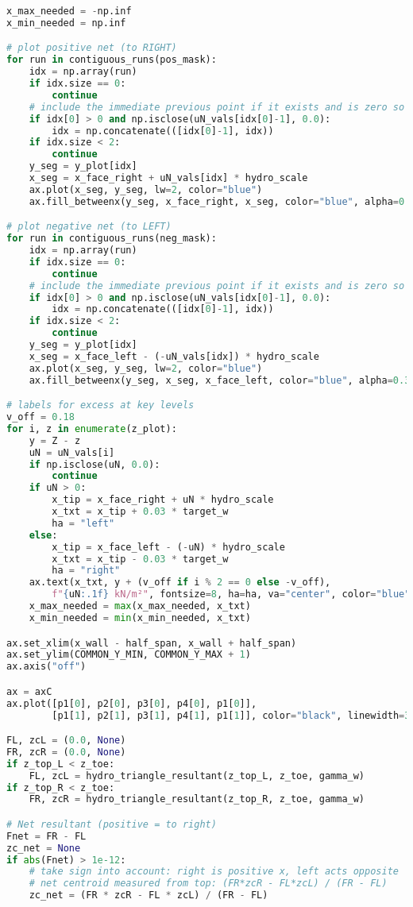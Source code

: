 \begin{lstlisting}[language=Python]
x_max_needed = -np.inf
x_min_needed = np.inf

# plot positive net (to RIGHT)
for run in contiguous_runs(pos_mask):
    idx = np.array(run)
    if idx.size == 0:
        continue
    # include the immediate previous point if it exists and is zero so the wedge anchors at GWT
    if idx[0] > 0 and np.isclose(uN_vals[idx[0]-1], 0.0):
        idx = np.concatenate(([idx[0]-1], idx))
    if idx.size < 2:
        continue
    y_seg = y_plot[idx]
    x_seg = x_face_right + uN_vals[idx] * hydro_scale
    ax.plot(x_seg, y_seg, lw=2, color="blue")
    ax.fill_betweenx(y_seg, x_face_right, x_seg, color="blue", alpha=0.30)

# plot negative net (to LEFT)
for run in contiguous_runs(neg_mask):
    idx = np.array(run)
    if idx.size == 0:
        continue
    # include the immediate previous point if it exists and is zero so the wedge anchors at GWT
    if idx[0] > 0 and np.isclose(uN_vals[idx[0]-1], 0.0):
        idx = np.concatenate(([idx[0]-1], idx))
    if idx.size < 2:
        continue
    y_seg = y_plot[idx]
    x_seg = x_face_left - (-uN_vals[idx]) * hydro_scale
    ax.plot(x_seg, y_seg, lw=2, color="blue")
    ax.fill_betweenx(y_seg, x_seg, x_face_left, color="blue", alpha=0.30)

# labels for excess at key levels
v_off = 0.18
for i, z in enumerate(z_plot):
    y = Z - z
    uN = uN_vals[i]
    if np.isclose(uN, 0.0):
        continue
    if uN > 0:
        x_tip = x_face_right + uN * hydro_scale
        x_txt = x_tip + 0.03 * target_w
        ha = "left"
    else:
        x_tip = x_face_left - (-uN) * hydro_scale
        x_txt = x_tip - 0.03 * target_w
        ha = "right"
    ax.text(x_txt, y + (v_off if i % 2 == 0 else -v_off),
        f"{uN:.1f} kN/m²", fontsize=8, ha=ha, va="center", color="blue")
    x_max_needed = max(x_max_needed, x_txt)
    x_min_needed = min(x_min_needed, x_txt)

ax.set_xlim(x_wall - half_span, x_wall + half_span)
ax.set_ylim(COMMON_Y_MIN, COMMON_Y_MAX + 1)
ax.axis("off")

ax = axC
ax.plot([p1[0], p2[0], p3[0], p4[0], p1[0]],
        [p1[1], p2[1], p3[1], p4[1], p1[1]], color="black", linewidth=3)

FL, zcL = (0.0, None)
FR, zcR = (0.0, None)
if z_top_L < z_toe:
    FL, zcL = hydro_triangle_resultant(z_top_L, z_toe, gamma_w)
if z_top_R < z_toe:
    FR, zcR = hydro_triangle_resultant(z_top_R, z_toe, gamma_w)

# Net resultant (positive = to right)
Fnet = FR - FL
zc_net = None
if abs(Fnet) > 1e-12:
    # take sign into account: right is positive x, left acts opposite
    # net centroid measured from top: (FR*zcR - FL*zcL) / (FR - FL)
    zc_net = (FR * zcR - FL * zcL) / (FR - FL)


\end{lstlisting}
